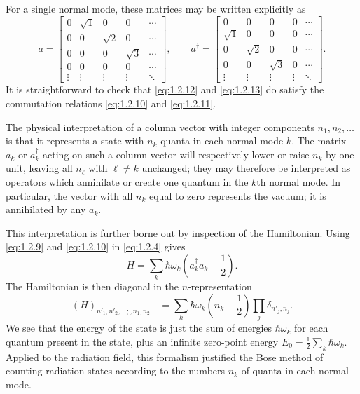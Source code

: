 For a single normal mode, these matrices may be written explicitly as
\[
  a=\begin{bmatrix}
    0&\sqrt1&0&0&\cdots\\
    0&0&\sqrt2&0&\cdots\\
    0&0&0&\sqrt3&\cdots\\
    0&0&0&0&\cdots\\
    \vdots&\vdots&\vdots&\vdots&\ddots
  \end{bmatrix},
  \qquad
  a^{\dagger}=\begin{bmatrix}
    0&0&0&0&\cdots\\
    \sqrt1&0&0&0&\cdots\\
    0&\sqrt2&0&0&\cdots\\
    0&0&\sqrt3&0&\cdots\\
    \vdots&\vdots&\vdots&\vdots&\ddots
  \end{bmatrix}.
\]
It is straightforward to check that \eqref{eq:1.2.12} and \eqref{eq:1.2.13} do satisfy the
commutation relations \eqref{eq:1.2.10} and \eqref{eq:1.2.11}.

The physical interpretation of a column vector with integer components
$n_1,n_2,\ldots$ is that it represents a state with $n_k$ quanta in each normal
mode $k$. The matrix $a_k$ or $a_k^{\dagger}$ acting on such a column vector
will respectively lower or raise $n_k$ by one unit, leaving all $n_{\ell}$ with
$\ell\ne k$ unchanged; they may therefore be interpreted as operators which
annihilate or create one quantum in the $k$th normal mode. In particular, the
vector with all $n_k$ equal to zero represents the vacuum; it is annihilated
by any $a_k$.

This interpretation is further borne out by inspection of the Hamiltonian.
Using \eqref{eq:1.2.9} and \eqref{eq:1.2.10} in \eqref{eq:1.2.4} gives
\begin{equation}
  H=\sum_k\hbar\omega_k\left(a_k^{\dagger}a_k+\frac12\right).
  \tag{1.2.14}\label{eq:1.2.14}
\end{equation}
The Hamiltonian is then diagonal in the $n$-representation
\begin{equation}
  (H)_{n'_1,n'_2,\ldots;,n_1,n_2,\ldots}
  =\sum_k\hbar\omega_k\left(n_k+\frac12\right)
  \prod_j\delta_{n'_j,n_j}.
  \tag{1.2.15}\label{eq:1.2.15}
\end{equation}
We see that the energy of the state is just the sum of energies $\hbar\omega_k$
for each quantum present in the state, plus an infinite zero-point energy
$E_0=\frac12\sum_k\hbar\omega_k$. Applied to the radiation field, this
formalism justified the Bose method of counting radiation states according
to the numbers $n_k$ of quanta in each normal mode.


